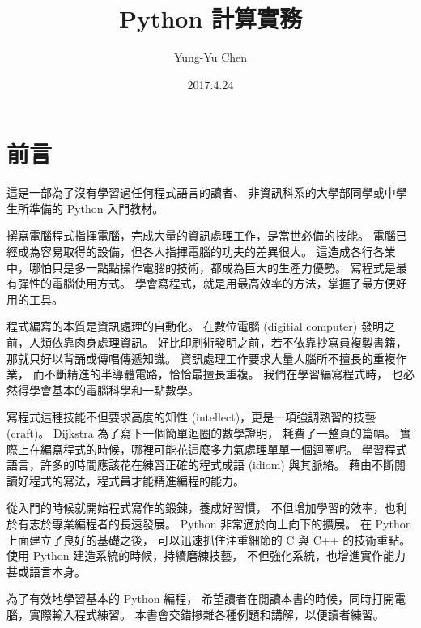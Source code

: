 \documentclass[a4paper,12pt]{book}
\theoremstyle{definition}
\begin{document}
\title{Python 計算實務}
\author{Yung-Yu Chen}
\date{2017.4.24
\\
}

\maketitle

\tableofcontents

\hspace{.5cm}

\frontmatter

\chapter{前言}

這是一部為了沒有學習過任何程式語言的讀者、
非資訊科系的大學部同學或中學生所準備的 Python 入門教材。

撰寫電腦程式指揮電腦，完成大量的資訊處理工作，是當世必備的技能。
電腦已經成為容易取得的設備，但各人指揮電腦的功夫的差異很大。
這造成各行各業中，哪怕只是多一點點操作電腦的技術，都成為巨大的生產力優勢。
寫程式是最有彈性的電腦使用方式。
學會寫程式，就是用最高效率的方法，掌握了最方便好用的工具。

程式編寫的本質是資訊處理的自動化。
在數位電腦 (digitial computer) 發明之前，人類依靠肉身處理資訊。
好比印刷術發明之前，若不依靠抄寫員複製書籍，那就只好以背誦或傳唱傳遞知識。
資訊處理工作要求大量人腦所不擅長的重複作業，
而不斷精進的半導體電路，恰恰最擅長重複。
我們在學習編寫程式時，
也必然得學會基本的電腦科學和一點數學。

寫程式這種技能不但要求高度的知性 (intellect)，更是一項強調熟習的技藝 (craft)。
Dijkstra 為了寫下一個簡單迴圈的數學證明，
耗費了一整頁的篇幅\cite{dahl_structured_1972}。
實際上在編寫程式的時候，哪裡可能花這麼多力氣處理單單一個迴圈呢。
學習程式語言，許多的時間應該花在練習正確的程式成語 (idiom) 與其脈絡。
藉由不斷閱讀好程式的寫法，程式員才能精進編程的能力。

從入門的時候就開始程式寫作的鍛鍊，養成好習慣，
不但增加學習的效率，也利於有志於專業編程者的長遠發展。
Python 非常適於向上向下的擴展。
在 Python 上面建立了良好的基礎之後，
可以迅速抓住注重細節的 C 與 C++ 的技術重點。
使用 Python 建造系統的時候，持續磨練技藝，
不但強化系統，也增進實作能力甚或語言本身。

為了有效地學習基本的 Python 編程，
希望讀者在閱讀本書的時候，同時打開電腦，實際輸入程式練習。
本書會交錯摻雜各種例題和講解，以便讀者練習。
\end{document}

